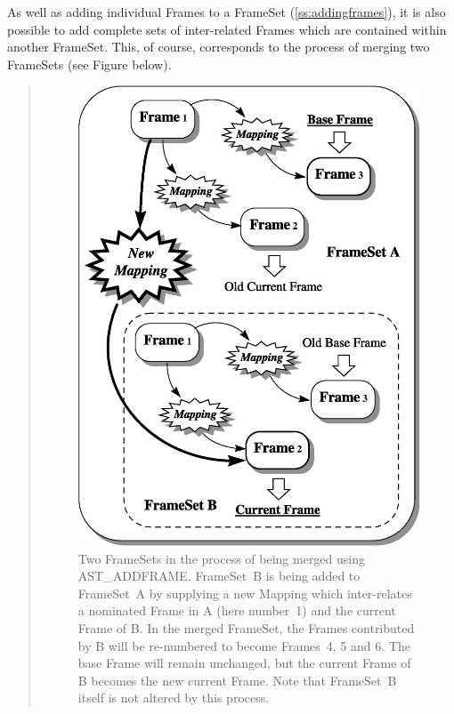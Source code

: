 \documentclass[twoside,11pt]{article}
\newcommand{\secref}[1]{\S\ref{#1}}
\renewcommand{\secref}[1]{\ref{#1}}
\begin{document}
\begin{htmlonly}
   As well as adding individual Frames to a FrameSet
   (\secref{ss:addingframes}), it is also possible to add complete sets of
   inter-related Frames which are contained within another
   FrameSet. This, of course, corresponds to the process of merging two
   FrameSets (see Figure below).
   \begin{quote}
   \begin{figure}[hbtp]
   \label{fig:fsmerge}
   \includegraphics[scale=0.75]{sun210_figures/fsmerge.eps}
   \caption{Two FrameSets in the process of being merged using
   AST\_ADDFRAME. FrameSet~B is being added to FrameSet~A by supplying a
   new Mapping which inter-relates a nominated Frame in A (here number~1)
   and the current Frame of B. In the merged FrameSet, the Frames
   contributed by B will be re-numbered to become Frames~4, 5 and 6. The
   base Frame will remain unchanged, but the current Frame of B becomes
   the new current Frame. Note that FrameSet~B itself is not
   altered by this process.}
   \end{figure}
   \end{quote}
\end{htmlonly}
\end{document}
